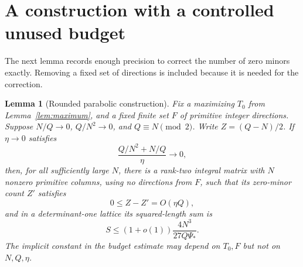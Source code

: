 \documentclass[11pt]{article}
\newtheorem{lemma}[theorem]{Lemma}
\theoremstyle{remark}\newtheorem{remark}[theorem]{Remark}
\begin{document}
\section{A construction with a controlled unused budget}
The next lemma records enough precision to correct the number of zero minors exactly. Removing a fixed set of directions is included because it is needed for the correction.

\begin{lemma}[Rounded parabolic construction]\label{lem:construction}
Fix a maximizing $T_0$ from Lemma~\ref{lem:maximum}, and a fixed finite set $F$ of primitive integer directions. Suppose $N/Q\to0$, $Q/N^2\to0$, and $Q\equiv N\pmod2$. Write $Z=(Q-N)/2$. If $\eta\to0$ satisfies
\[
 \frac{Q/N^2+N/Q}{\eta}\longrightarrow0,
\]
then, for all sufficiently large $N$, there is a rank-two integral matrix with $N$ nonzero primitive columns, using no directions from $F$, such that its zero-minor count $Z'$ satisfies
\[
 0\le Z-Z'=O(\eta Q),
\]
and in a determinant-one lattice its squared-length sum is
\[
 S\le(1+o(1))\frac{4N^3}{27Q\Psi_*}.
\]
The implicit constant in the budget estimate may depend on $T_0,F$ but not on $N,Q,\eta$.
\end{lemma}
\end{document}
